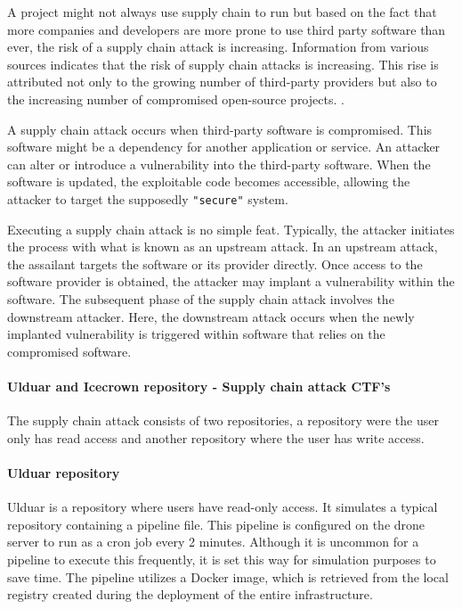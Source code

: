 A project might not always use supply chain to run but based on the fact that more companies and developers are more prone to use 
third party software than ever, the risk of a supply chain attack is increasing. 
Information from various sources indicates that the risk of supply chain attacks is increasing. 
This rise is attributed not only to the growing number of third-party providers but also to the increasing number of compromised open-source projects.
\cite{supplychainbrain_supply_chain_breaches}\cite{statista_open_source_supply_chain_attacks}.

A supply chain attack occurs when third-party software is compromised. This software might be a dependency for another application or service.
 An attacker can alter or introduce a vulnerability into the third-party software. 
When the software is updated, the exploitable code becomes accessible, allowing the attacker to target the supposedly \texttt{"secure"} system.

Executing a supply chain attack is no simple feat. Typically, the attacker initiates the process with what is known as an upstream attack. 
In an upstream attack, the assailant targets the software or its provider directly. Once access to the software provider is obtained, 
the attacker may implant a vulnerability within the software. The subsequent phase of the supply chain attack involves the downstream attacker. 
Here, the downstream attack occurs when the newly implanted vulnerability is triggered within software that relies on the compromised software.
\cite{cloudflare_supply_chain_attack}

\paragraph{Ulduar and Icecrown repository - Supply chain attack CTF's}
The supply chain attack consists of two repositories, a repository were the user only has read access and another 
repository where the user has write access. 

\paragraph{Ulduar repository\cite{flask-blog}}
Ulduar is a repository where users have read-only access. It simulates a typical repository containing a pipeline file. 
This pipeline is configured on the drone server to run as a cron job every 2 minutes. 
Although it is uncommon for a pipeline to execute this frequently, it is set this way for simulation purposes to save time. 
The pipeline utilizes a Docker image, 
which is retrieved from the local registry created during the deployment of the entire infrastructure.


